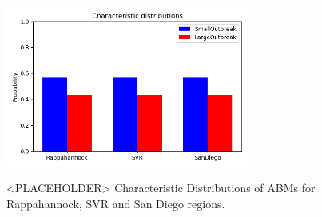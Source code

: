 \begin{figure}
    \centering
    \includegraphics[height=6cm,width=8cm]{AAMAS20Template-submission/figures/CharacteristicDistributions.png}
    \caption{<PLACEHOLDER> Characteristic Distributions of ABMs for Rappahannock, SVR and San Diego regions.}
    \label{fig:characteristicDistri}
\end{figure}